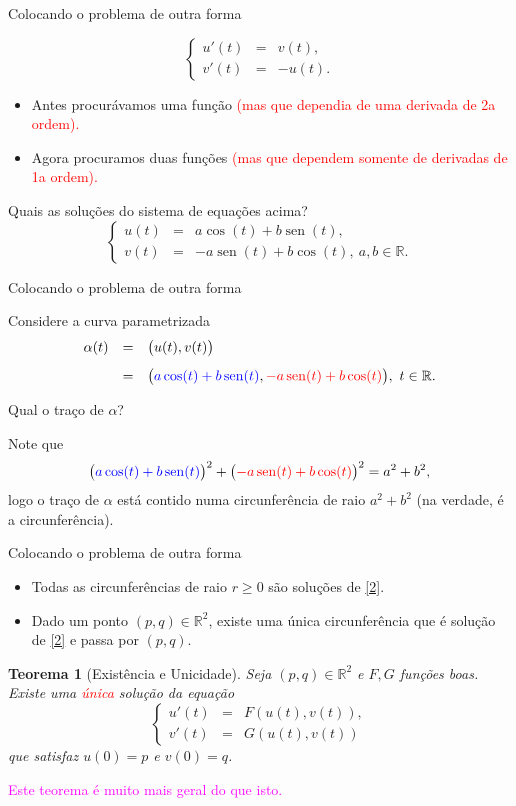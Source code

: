 \documentclass[11pt]{beamer}
\newtheorem{teorema}{Teorema}
\DeclareMathOperator{\sen}{sen}
\newcommand{\R}{\mathbb R}
\newcommand{\RR}{\mathbb R^2}
\begin{document}
\begin{frame}[t]{Colocando o problema de outra forma}

\[
\left\{\begin{array}{lcl}
u'(t)&=&v(t),\\
v'(t)&=&-u(t).
\end{array}
\right.
\]
 \pause 
\begin{itemize}
\item Antes procurávamos uma função \textcolor{red}{(mas que dependia de uma derivada de 2a ordem).}
\item Agora procuramos duas funções \textcolor{red}{(mas que dependem somente de derivadas de 1a ordem).}
\end{itemize}
 \pause 
Quais as soluções do sistema de equações acima?\pause 
\[
\left\{\begin{array}{lcl}
u(t)&=&a\cos(t)+b\sen(t),\\
v(t)&=&-a\sen(t)+b\cos(t), \ a,b\in\R.
\end{array}\right.
\]


\end{frame}

\begin{frame}[t]{Colocando o problema de outra forma}

Considere a curva parametrizada
\[
\begin{array}{lcl}
\vspace{0.3cm}\alpha(t)&=&\big(u(t),v(t)\big)\\
&=&\big(\textcolor{blue}{a\cos(t)+b\sen(t)},\textcolor{red}{-a\sen(t)+b\cos(t)} \big), \ t\in\R.
\end{array}
\]

Qual o traço de $\alpha$? \pause 

Note que
\[\big(\textcolor{blue}{a\cos(t)+b\sen(t)}\big)^2+\big(\textcolor{red}{-a\sen(t)+b\cos(t)}\big)^2=a^2+b^2,\]logo o traço de $\alpha$ está contido numa circunferência de raio $a^2+b^2$ (na verdade, é a circunferência).
\end{frame}


\begin{frame}[t]{Colocando o problema de outra forma}

\begin{itemize}
\item Todas as circunferências de raio $r\geq 0$ são soluções de \eqref{2}. \pause 
\item Dado um ponto $(p,q)\in\RR$, existe uma única circunferência que é solução de \eqref{2} e  passa por $(p,q)$. \pause 
\end{itemize}

\begin{teorema}[Existência e Unicidade] Seja $(p,q)\in\RR$ e $F,G$ funções boas. Existe uma \textcolor{red}{única} solução da equação
\[
\left\{\begin{array}{lcl}
u'(t)&=&F(u(t),v(t)),\\
v'(t)&=&G(u(t),v(t))
\end{array}
\right.
\]
que satisfaz $u(0)=p$ e $v(0)=q$.
\end{teorema}

\textcolor{magenta}{Este teorema é muito mais geral do que isto.}
\end{frame}
\end{document}
